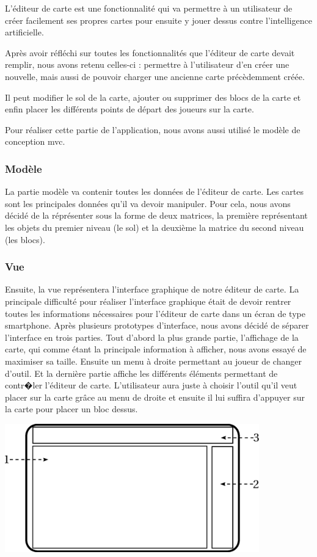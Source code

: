 	L'éditeur de carte est une fonctionnalité qui va permettre à un utilisateur
	 de créer facilement ses propres cartes pour ensuite y jouer dessus contre 
	 l'intelligence artificielle.
	 
	Après avoir réfléchi sur toutes les fonctionnalités que l'éditeur de carte 
	devait remplir, nous avons retenu celles-ci : permettre à l'utilisateur 
	d'en créer une nouvelle, mais aussi de pouvoir charger une ancienne carte 
	précèdemment créée.
	
	Il peut modifier le sol de la carte, ajouter ou supprimer des blocs de 
	la carte et enfin placer les différents points de départ des joueurs sur 
	la carte.
		
	Pour réaliser cette partie de l'application, nous avons aussi utilisé le 
	modèle de conception \gls{mvc}.

	\subsubsection*{Modèle}
		La partie modèle va contenir toutes les données de l'éditeur de carte. Les cartes sont les principales données qu'il va devoir manipuler. Pour cela, nous avons décidé de la réprésenter sous la forme de deux matrices, la première représentant les objets du premier niveau (le sol) et la deuxième la matrice du second niveau (les blocs).
			
			
	\subsubsection*{Vue}
		Ensuite, la vue représentera l'interface graphique de notre éditeur de carte. La principale difficulté pour réaliser l'interface graphique était de devoir rentrer toutes les informations nécessaires pour l'éditeur de carte dans un écran de type \gls{smartphone}. Après plusieurs prototypes d'interface, nous avons décidé de séparer l'interface en trois parties. Tout d'abord la plus grande partie, l'affichage de la carte, qui comme étant la principale information à afficher, nous avons essayé de maximiser sa taille. Ensuite un menu à droite permettant au joueur de changer d'outil. Et la dernière partie affiche les différents éléments permettant de contr�ler l'éditeur de carte. L'utilisateur aura juste à choisir l'outil qu'il veut placer sur la carte grâce au menu de droite et ensuite il lui suffira d'appuyer sur la carte pour placer un bloc dessus.
		
		\begin{center}
			\includegraphics[width=11cm]{./Analyse/Img/14-Editeur_de_niveau.eps}
		\end{center} 
			
